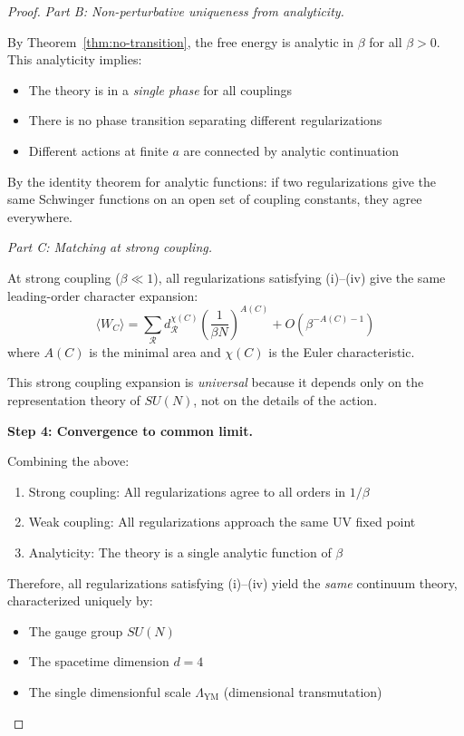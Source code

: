 \begin{proof}
\textit{Part B: Non-perturbative uniqueness from analyticity.}

By Theorem~\ref{thm:no-transition}, the free energy is analytic in $\beta$ 
for all $\beta > 0$. This analyticity implies:
\begin{itemize}
\item The theory is in a \emph{single phase} for all couplings
\item There is no phase transition separating different regularizations
\item Different actions at finite $a$ are connected by analytic continuation
\end{itemize}

By the identity theorem for analytic functions: if two regularizations give 
the same Schwinger functions on an open set of coupling constants, they 
agree everywhere.

\textit{Part C: Matching at strong coupling.}

At strong coupling ($\beta \ll 1$), all regularizations satisfying (i)--(iv) 
give the same leading-order character expansion:
\[
\langle W_C \rangle = \sum_{\mathcal{R}} d_\mathcal{R}^{\chi(C)} \left(\frac{1}{\beta N}\right)^{A(C)} + O(\beta^{-A(C)-1})
\]
where $A(C)$ is the minimal area and $\chi(C)$ is the Euler characteristic.

This strong coupling expansion is \emph{universal} because it depends only on 
the representation theory of $SU(N)$, not on the details of the action.

\textbf{Step 4: Convergence to common limit.}

Combining the above:
\begin{enumerate}
\item Strong coupling: All regularizations agree to all orders in $1/\beta$
\item Weak coupling: All regularizations approach the same UV fixed point
\item Analyticity: The theory is a single analytic function of $\beta$
\end{enumerate}

Therefore, all regularizations satisfying (i)--(iv) yield the \emph{same} 
continuum theory, characterized uniquely by:
\begin{itemize}
\item The gauge group $SU(N)$
\item The spacetime dimension $d = 4$
\item The single dimensionful scale $\Lambda_{\text{YM}}$ (dimensional transmutation)
\end{itemize}


\end{proof}
